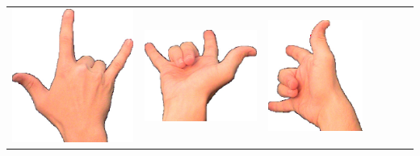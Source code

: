 \documentclass{article}
\begin{document}
\begin{center}
\begin{tabular}{r*{6}{c}}
\includegraphics[scale=0.1]{images/06-09-3.jpg}&
\includegraphics[scale=0.1]{images/06-09-4.jpg}&
\includegraphics[scale=0.1]{images/06-09-5.jpg}&

\end{tabular}
\end{center}
\end{document}
